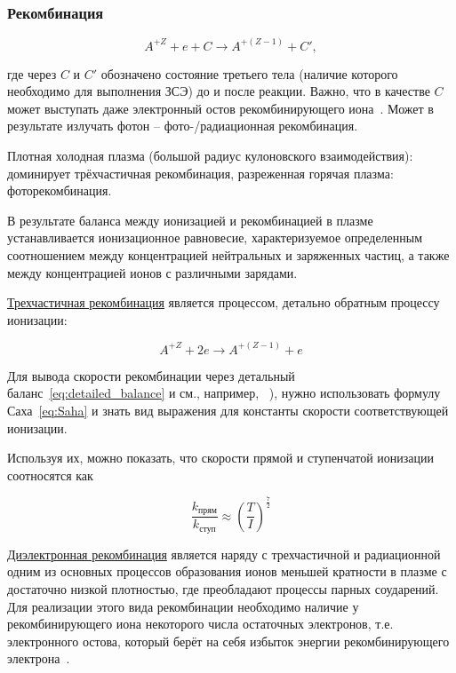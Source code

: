 \documentclass[10pt, a4paper]{article}
\begin{document}
\subsubsection{Рекомбинация} \label{subsubsec:recombination}

\begin{equation}
	A^{+Z} + e + C \rightarrow A^{+(Z-1)} + C',
\end{equation}

где через $C$ и $C'$ обозначено состояние третьего тела (наличие которого необходимо для выполнения ЗСЭ) до и после реакции. Важно, что в качестве $C$ может выступать даже электронный остов рекомбинирующего иона~\cite{astap}. Может в результате излучать фотон -- фото-/радиационная рекомбинация.

Плотная холодная плазма (большой радиус кулоновского взаимодействия): доминирует трёхчастичная рекомбинация, разреженная горячая плазма: фоторекомбинация.

В результате баланса между ионизацией и рекомбинацией в плазме устанавливается ионизационное равновесие, характеризуемое определенным соотношением между концентрацией нейтральных и заряженных частиц, а также между концентрацией
ионов с различными зарядами. 

\uline{Трехчастичная рекомбинация} является процессом, детально обратным процессу ионизации:

\begin{equation*}
	A^{+Z} + 2e \rightarrow A^{+(Z-1)} + e 
\end{equation*}

Для вывода скорости рекомбинации через детальный баланс~\eqref{eq:detailed_balance} и см., например, ~\cite{astap}), нужно использовать формулу Саха~\eqref{eq:Saha} и знать вид выражения для константы скорости соответствующей ионизации.

Используя их, можно показать, что скорости прямой и ступенчатой ионизации соотносятся как

\begin{equation}
	\frac{k_{\text{прям}}}{k_{\text{ступ}}} \approx \left(\frac{T}{I}\right)^{\frac{7}{2}}
\end{equation}

\uline{Диэлектронная рекомбинация} является наряду с трехчастичной и радиационной одним из основных процессов образования ионов меньшей кратности в плазме с достаточно низкой плотностью, где преобладают процессы парных соударений. Для реализации этого вида рекомбинации необходимо наличие у рекомбинирующего иона некоторого числа остаточных электронов, т.е. электронного остова, который берёт на себя избыток энергии рекомбинирующего электрона~\cite{astap, raizer}.
\end{document}
